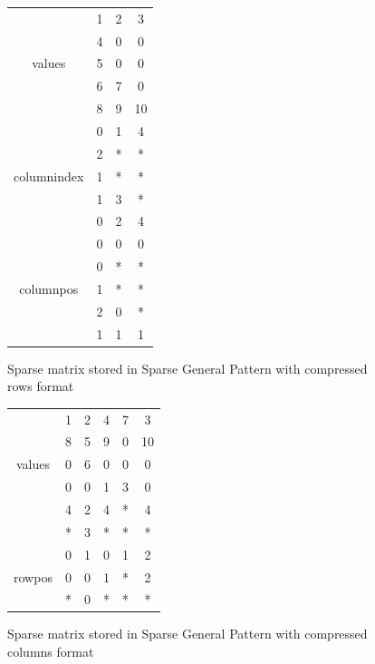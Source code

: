 \begin{figure}[h]
\centering
\begin{tabular}{c|ccc|}
	\cline{2-4}
	  \multirow{5}{*}{values}    & 1 & 2 & 3  \\
	                             & 4 & 0 & 0  \\
	                             & 5 & 0 & 0  \\
	                             & 6 & 7 & 0  \\
	                             & 8 & 9 & 10 \\ \cline{2-4}
	\multirow{5}{*}{columnindex} & 0 & 1 & 4  \\
	                             & 2 & * & *  \\
	                             & 1 & * & *  \\
	                             & 1 & 3 & *  \\
	                             & 0 & 2 & 4  \\ \cline{2-4}
	 \multirow{5}{*}{columnpos}  & 0 & 0 & 0  \\
	                             & 0 & * & *  \\
	                             & 1 & * & *  \\
	                             & 2 & 0 & *  \\
	                             & 1 & 1 & 1  \\ \cline{2-4}
\end{tabular}
\caption{Sparse matrix stored in Sparse General Pattern with compressed rows format \label{fig:methods:sgpr_ex}}
\end{figure}


\begin{figure}[h]
\centering
\begin{tabular}{c|ccccc|}
	\cline{2-6}
	 \multirow{5}{*}{values}  & 1 & 2 & 4 & 7 & 3  \\
	                          & 8 & 5 & 9 & 0 & 10 \\
	                          & 0 & 6 & 0 & 0 & 0  \\ \cline{2-6}
	\multirow{5}{*}{rowindex} & 0 & 0 & 1 & 3 & 0  \\
	                          & 4 & 2 & 4 & * & 4  \\
	                          & * & 3 & * & * & *  \\ \cline{2-6}
	 \multirow{5}{*}{rowpos}  & 0 & 1 & 0 & 1 & 2  \\
	                          & 0 & 0 & 1 & * & 2  \\
	                          & * & 0 & * & * & *  \\ \cline{2-6}
\end{tabular}
\caption{Sparse matrix stored in Sparse General Pattern with compressed columns format \label{fig:methods:sgpc_ex}}
\end{figure}


